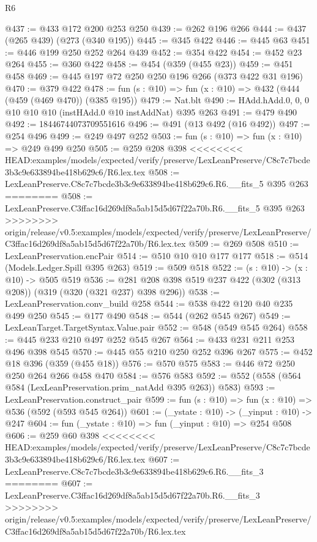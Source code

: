 \begin{lexlean}{R6}
\begin{coremodule}
{{{{{{{{{{{{{{{@437 := @433 @172 @200 @253 @250
@439 := @262 @196 @266
@444 := @437 (@265 @439) (@273 (@340 @195))
@445 := @345 @422
@446 := @445 @63
@451 := @446 @199 @250 @252 @264 @439
@452 := @354 @422
@454 := @452 @23 @264
@455 := @360 @422
@458 := @454 (@359 (@455 @23))
@459 := @451 @458
@469 := @445 @197 @72 @250 @250 @196 @266 (@373 @422 @31 @196)
@470 := @379 @422
@478 := fun (s : @10) => fun (x : @10) => @432 (@444 (@459 (@469 @470)) (@385 @195))
@479 := Nat.blt
@490 := HAdd.hAdd.{0, 0, 0} @10 @10 @10 (instHAdd.{0} @10 instAddNat) @395 @263
@491 := @479 @490
@492 := 18446744073709551616
@496 := @491 (@13 @492 (@16 @492))
@497 := @254 @496
@499 := @249 @497 @252
@503 := fun (s : @10) => fun (x : @10) => @249 @499 @250
@505 := @259 @208 @398
<<<<<<<< HEAD:examples/models/expected/verify/preserve/LexLeanPreserve/C8c7c7bcde3b3c9e633894be418b629c6/R6.lex.tex
@508 := LexLeanPreserve.C8c7c7bcde3b3c9e633894be418b629c6.R6.__fits_5 @395 @263
========
@508 := LexLeanPreserve.C3ffac16d269df8a5ab15d5d67f22a70b.R6.__fits_5 @395 @263
>>>>>>>> origin/release/v0.5:examples/models/expected/verify/preserve/LexLeanPreserve/C3ffac16d269df8a5ab15d5d67f22a70b/R6.lex.tex
@509 := @269 @508
@510 := LexLeanPreservation.encPair
@514 := @510 @10 @10 @177 @177
@518 := @514 (Models.Ledger.Spill @395 @263)
@519 := @509 @518
@522 := (s : @10) -> (x : @10) -> @505 @519
@536 := @281 @208 @398 @519 @237 @422 (@302 (@313 @208)) (@319 (@320 (@321 @237) @398 @296))
@538 := LexLeanPreservation.conv_build @258
@544 := @538 @422 @120 @40 @235 @499 @250
@545 := @177 @490
@548 := @544 (@262 @545 @267)
@549 := LexLeanTarget.TargetSyntax.Value.pair
@552 := @548 (@549 @545 @264)
@558 := @445 @233 @210 @497 @252 @545 @267
@564 := @433 @231 @211 @253 @496 @398 @545
@570 := @445 @55 @210 @250 @252 @396 @267
@575 := @452 @18 @396 (@359 (@455 @18))
@576 := @570 @575
@583 := @446 @72 @250 @250 @264 @266 @458 @470
@584 := @576 @583
@592 := @552 (@558 (@564 @584 (LexLeanPreservation.prim_natAdd @395 @263)) @583)
@593 := LexLeanPreservation.construct_pair
@599 := fun (s : @10) => fun (x : @10) => @536 (@592 (@593 @545 @264))
@601 := (_ystate : @10) -> (_yinput : @10) -> @247
@604 := fun (_ystate : @10) => fun (_yinput : @10) => @254 @508
@606 := @259 @60 @398
<<<<<<<< HEAD:examples/models/expected/verify/preserve/LexLeanPreserve/C8c7c7bcde3b3c9e633894be418b629c6/R6.lex.tex
@607 := LexLeanPreserve.C8c7c7bcde3b3c9e633894be418b629c6.R6.__fits_3
========
@607 := LexLeanPreserve.C3ffac16d269df8a5ab15d5d67f22a70b.R6.__fits_3
>>>>>>>> origin/release/v0.5:examples/models/expected/verify/preserve/LexLeanPreserve/C3ffac16d269df8a5ab15d5d67f22a70b/R6.lex.tex
}}}}}}}}}}}}}}}
\end{coremodule}
\end{lexlean}
